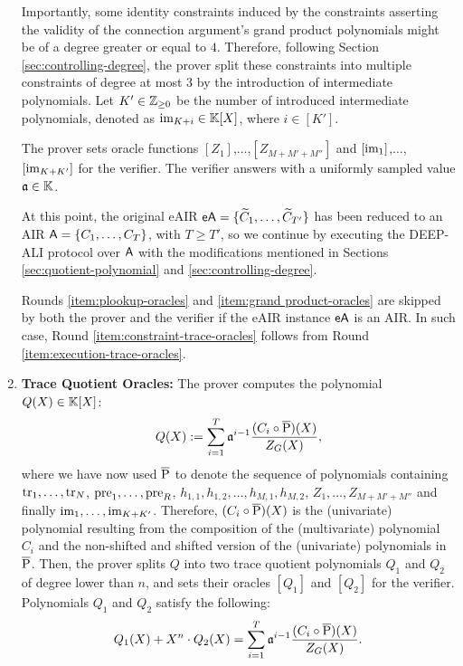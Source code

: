 \begin{protocol}
\begin{enumerate}
  Importantly, some identity constraints induced by the constraints asserting the validity of the connection argument's grand product polynomials might be of a degree greater or equal to $4$. Therefore, following Section \ref{sec:controlling-degree}, the prover split these constraints into multiple constraints of degree at most $3$ by the introduction of intermediate polynomials. Let $K' \in \mathbb{Z}_{\geq 0}$ be the number of introduced intermediate polynomials, denoted as $\text{im}_{K+i} \in \mathbb{K}[X]$, where $i \in [K']$. 
  
  The prover sets oracle functions $[Z_1]$,$\dots$,$[Z_{M+M'+M''}]$ and $[\text{im}_1]$,$\dots$,$[\text{im}_{K+K'}]$ for the verifier. The verifier answers with a uniformly sampled value $\mathfrak{a} \in \mathbb{K}$. \label{item:grand product-oracles}
  
  At this point, the original eAIR $\textsf{eA} = \{\widetilde{C}_1,\dots,\widetilde{C}_{T'}\}$ has been reduced to an AIR $\textsf{A} = \{C_1,\dots,C_T\}$, with $T \geq T'$, so we continue by executing the DEEP-ALI protocol over $\textsf{A}$ with the modifications mentioned in Sections \ref{sec:quotient-polynomial} and \ref{sec:controlling-degree}. 
  \begin{bremark}
    Rounds \ref{item:plookup-oracles} and \ref{item:grand product-oracles} are skipped by both the prover and the verifier if the eAIR instance $\textsf{eA}$ is an AIR. In such case, Round \ref{item:constraint-trace-oracles} follows from Round \ref{item:execution-trace-oracles}.
  \end{bremark}

  \item \textbf{Trace Quotient Oracles:} The prover computes the polynomial $Q(X) \in \mathbb{K}[X]$:
  \begin{equation}\label{eq:trace-quotient}
    Q(X) := \sum_{i=1}^T \mathfrak{a}^{i-1} \frac{(C_i \circ \overline{\text{P}})(X)}{Z_G(X)},
  \end{equation}
  where we have now used $\overline{\text{P}}$ to denote the sequence of polynomials containing $\text{tr}_1,\dots,\text{tr}_N$, $\text{pre}_1,\dots,\text{pre}_R$, $h_{1,1},h_{1,2},\dots,h_{M,1},h_{M,2}$, $Z_1,\dots,Z_{M+M'+M''}$ and finally $\text{im}_1,\dots,\text{im}_{K+K'}$. Therefore, $(C_i \circ \overline{\text{P}})(X)$ is the (univariate) polynomial resulting from the composition of the (multivariate) polynomial $C_i$ and the non-shifted and shifted version of the (univariate) polynomials in $\overline{\text{P}}$. Then, the prover splits $Q$ into two trace quotient polynomials $Q_1$ and $Q_2$ of degree lower than $n$, and sets their oracles $[Q_1]$ and $[Q_2]$ for the verifier. Polynomials $Q_1$ and $Q_2$ satisfy the following:
  \begin{equation}\label{eq:ali-check}
    Q_1(X) + X^n \cdot Q_2(X) = \sum_{i=1}^T \mathfrak{a}^{i-1} \frac{(C_i \circ \overline{\text{P}})(X)}{Z_G(X)}.
  \end{equation}
   \label{item:constraint-trace-oracles}


\end{enumerate}
\end{protocol}
